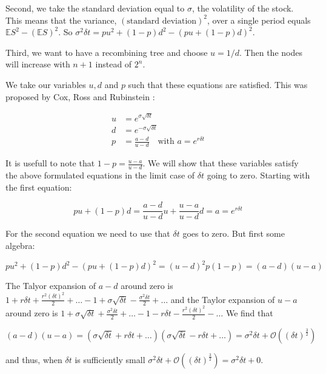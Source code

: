 \documentclass[11pt,a4paper]{article}
\begin{document}
Second, we take the standard deviation equal to $\sigma$, the volatility of the stock. This means that the variance, $(\text{standard deviation})^2$, over a single period equals $\mathbb{E}S^2-(\mathbb{E}S)^2$. So $\sigma^2\delta t=pu^2+(1-p)d^2-(pu+(1-p)d)^2$.

Third, we want to have a recombining tree and choose $u=1/d$. Then the nodes will increase with $n+1$ instead of $2^n$.

We take our variables $u,d$ and $p$ such that these equations are satisfied. This was proposed by Cox, Ross and Rubinstein \cite{rubinstein}:

\begin{align}
u&=e^{\sigma\sqrt{\delta t}}\nonumber \\
d&=e^{-\sigma\sqrt{\delta t}}\nonumber \\
p&=\frac{a-d}{u-d} \quad \text{with } a=e^{r\delta t}
\end{align}

It is usefull to note that $1-p=\frac{u-a}{u-d}$. We will show that these variables satisfy the above formulated equations in the limit case of $\delta t$ going to zero. Starting with the first equation:

\begin{equation}
pu+(1-p)d=\frac{a-d}{u-d} u + \frac{u-a}{u-d} d = a = e^{r\delta t}
\end{equation}

For the second equation we need to use that $\delta t$ goes to zero. But first some algebra:

\begin{equation}
pu^2+(1-p)d^2-(pu+(1-p)d)^2 = (u-d)^2p(1-p)=(a-d)(u-a)
\end{equation}

The Talyor expansion of $a-d$ around zero is $1+r\delta t+\frac{r^2(\delta t)^2}{2}+\ldots-1+\sigma \sqrt{\delta t}-\frac{\sigma^2\delta t}{2}+\ldots$ and the Taylor expansion of $u-a$ around zero is $1+\sigma \sqrt{\delta t}+\frac{\sigma^2\delta t}{2}+\ldots-1-r\delta t-\frac{r^2(\delta t)^2}{2}-\ldots$ We find that

\begin{equation}
(a-d)(u-a)=(\sigma\sqrt{\delta t}+r\delta t+\ldots)(\sigma\sqrt{\delta t}-r\delta t+\ldots)=\sigma^2\delta t+\mathcal{O}((\delta t)^\frac{3}{2})
\end{equation}

and thus, when $\delta t$ is sufficiently small $\sigma^2\delta t+\mathcal{O}((\delta t)^\frac{3}{2})=\sigma^2\delta t+0$.
\end{document}
